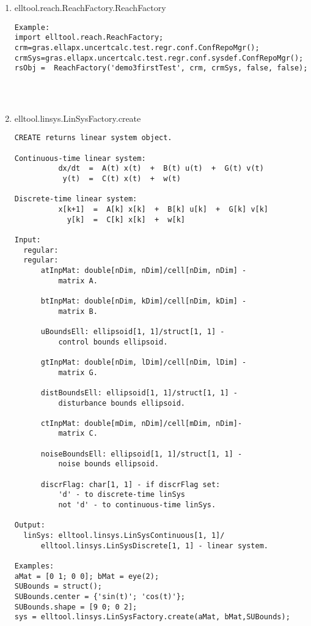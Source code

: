 \begin{enumerate}
\begin{lstlisting}
\end{lstlisting}
\fontfamily{\familydefault}
\selectfont
\item {elltool.reach.ReachFactory.ReachFactory}
\selectfont
\begin{lstlisting}
Example:
import elltool.reach.ReachFactory;
crm=gras.ellapx.uncertcalc.test.regr.conf.ConfRepoMgr();
crmSys=gras.ellapx.uncertcalc.test.regr.conf.sysdef.ConfRepoMgr();
rsObj =  ReachFactory('demo3firstTest', crm, crmSys, false, false);




\end{lstlisting}
\fontfamily{\familydefault}
\selectfont
\item {elltool.linsys.LinSysFactory.create}
\selectfont
\begin{lstlisting}
CREATE returns linear system object.

Continuous-time linear system:
          dx/dt  =  A(t) x(t)  +  B(t) u(t)  +  G(t) v(t)
           y(t)  =  C(t) x(t)  +  w(t)

Discrete-time linear system:
          x[k+1]  =  A[k] x[k]  +  B[k] u[k]  +  G[k] v[k]
            y[k]  =  C[k] x[k]  +  w[k]

Input:
  regular:
  regular:
      atInpMat: double[nDim, nDim]/cell[nDim, nDim] -
          matrix A.

      btInpMat: double[nDim, kDim]/cell[nDim, kDim] -
          matrix B.

      uBoundsEll: ellipsoid[1, 1]/struct[1, 1] -
          control bounds ellipsoid.

      gtInpMat: double[nDim, lDim]/cell[nDim, lDim] -
          matrix G.

      distBoundsEll: ellipsoid[1, 1]/struct[1, 1] -
          disturbance bounds ellipsoid.

      ctInpMat: double[mDim, nDim]/cell[mDim, nDim]-
          matrix C.

      noiseBoundsEll: ellipsoid[1, 1]/struct[1, 1] -
          noise bounds ellipsoid.

      discrFlag: char[1, 1] - if discrFlag set:
          'd' - to discrete-time linSys
          not 'd' - to continuous-time linSys.

Output:
  linSys: elltool.linsys.LinSysContinuous[1, 1]/
      elltool.linsys.LinSysDiscrete[1, 1] - linear system.

Examples:
aMat = [0 1; 0 0]; bMat = eye(2);
SUBounds = struct();
SUBounds.center = {'sin(t)'; 'cos(t)'};
SUBounds.shape = [9 0; 0 2];
sys = elltool.linsys.LinSysFactory.create(aMat, bMat,SUBounds);





\end{lstlisting}
\end{enumerate}
